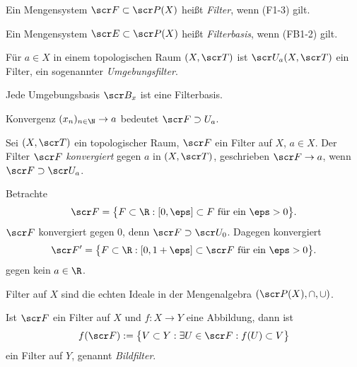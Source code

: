 \begin{df}
	Ein Mengensystem $\scr F \subset \scr P(X)$ heißt \emph{Filter}, wenn (F1-3) gilt.

	Ein Mengensystem $\scr E \subset \scr P(X)$ heißt \emph{Filterbasis}, wenn (FB1-2) gilt.
\end{df}

\begin{ex}
	Für $a \in X$ in einem topologischen Raum $(X, \scr T)$ ist $\scr U_a(X, \scr T)$ ein Filter, ein sogenannter \emph{Umgebungsfilter}.

	Jede Umgebungsbasis $\scr B_x$ ist eine Filterbasis.
\end{ex}

\begin{nt}
	Konvergenz $(x_n)_{n\in\N} \to a$ bedeutet $\scr F \supset U_a$.
\end{nt}

\begin{df}
	Sei $(X, \scr T)$ ein topologischer Raum, $\scr F$ ein Filter auf $X$, $a \in X$.
	Der Filter $\scr F$ \emph{konvergiert} gegen $a$ in $(X, \scr T)$, geschrieben $\scr F \to a$, wenn $\scr F \supset \scr U_a$.
\end{df}

\begin{ex}
	Betrachte
	\[
		\scr F = \big\{ F \subset \R : [0,\eps] \subset F \text{ für ein $\eps > 0$} \big\}.
	\]
	$\scr F$ konvergiert gegen $0$, denn $\scr F \supset \scr U_0$.
	Dagegen konvergiert
	\[
		\scr F' = \big\{ F \subset \R : [0,1+\eps] \subset \scr F \text{ für ein $\eps > 0$} \big\}.
	\]
	gegen kein $a \in \R$.
\end{ex}

\begin{nt}
	Filter auf $X$ sind die echten Ideale in der Mengenalgebra $(\scr P(X), \cap, \cup)$.
\end{nt}

\begin{df}
	Ist $\scr F$ ein Filter auf $X$ und $f: X \to Y$ eine Abbildung, dann ist
	\[
		f(\scr F)
		:= \big\{ V \subset Y : \exists U \in \scr F : f(U) \subset V \big\}
	\]
	ein Filter auf $Y$, genannt \emph{Bildfilter}.
\end{df}

